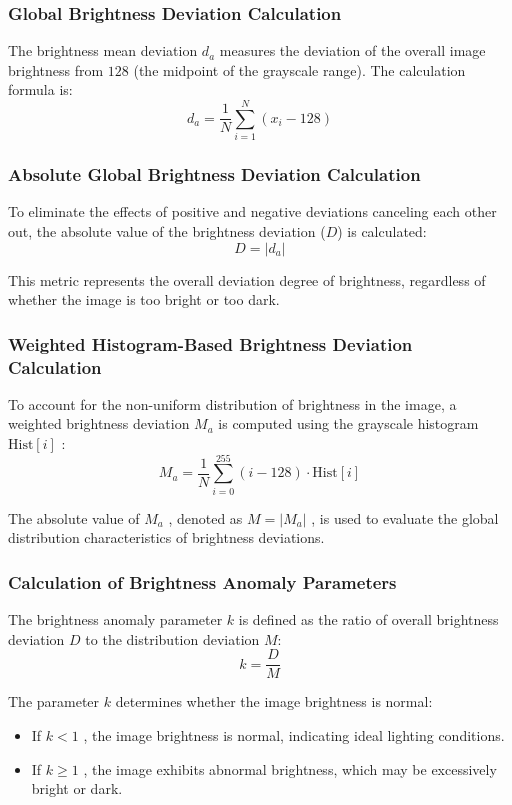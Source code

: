 \documentclass[withoutpreface,bwprint]{cumcmthesis}
\begin{document}
\subsubsection{Global Brightness Deviation Calculation}

The brightness mean deviation $d_a$ measures the deviation of the overall image brightness from $128$ (the midpoint of the grayscale range). The calculation formula is:
\[d_a = \frac{1}{N} \sum_{i=1}^{N} (x_i - 128)\]


\subsubsection{Absolute Global Brightness Deviation Calculation}

To eliminate the effects of positive and negative deviations canceling each other out, the absolute value of the brightness deviation (\( D \)) is calculated:
\[D = |d_a|\]

This metric represents the overall deviation degree of brightness, regardless of whether the image is too bright or too dark.

\subsubsection{Weighted Histogram-Based Brightness Deviation Calculation}

To account for the non-uniform distribution of brightness in the image, a weighted brightness deviation $M_a$ is computed using the grayscale histogram $\text{Hist}[i]$ :
\[M_a = \frac{1}{N} \sum_{i=0}^{255} (i - 128) \cdot \text{Hist}[i]\]


The absolute value of  $M_a$ , denoted as $M = |M_a|$ , is used to evaluate the global distribution characteristics of brightness deviations.

\subsubsection{Calculation of Brightness Anomaly Parameters}

The brightness anomaly parameter $k$ is defined as the ratio of overall brightness deviation $D$ to the distribution deviation $M$:
\[k = \frac{D}{M}\]


The parameter $k$ determines whether the image brightness is normal:

\begin{itemize}[itemindent=2em]
    \item If $k < 1$ , the image brightness is normal, indicating ideal lighting conditions.

    \item If  $k \geq 1$ , the image exhibits abnormal brightness, which may be excessively bright or dark.
\end{itemize}
\end{document}
